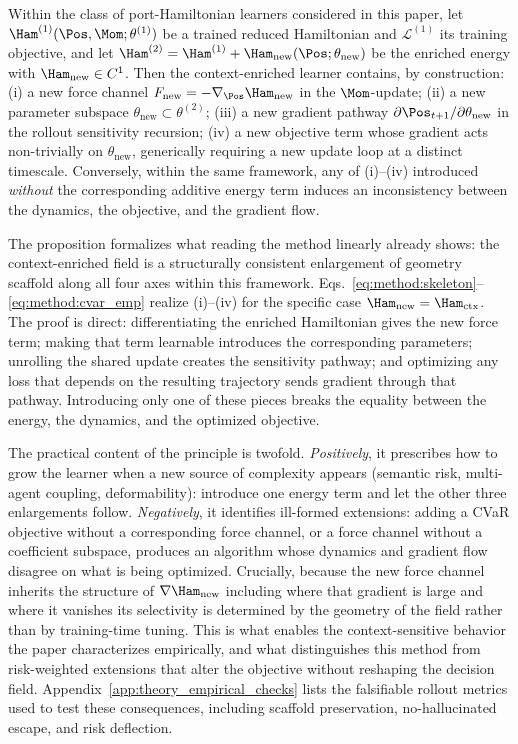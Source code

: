 \begin{proposition}
\label{prop:enrichment}
Within the class of port-Hamiltonian learners considered in this paper,
let $\Ham^{(1)}(\Pos, \Mom; \theta^{(1)})$ be a trained reduced
Hamiltonian and $\mathcal{L}^{(1)}$ its training objective, and let
$\Ham^{(2)} = \Ham^{(1)} + \Ham_{\mathrm{new}}(\Pos; \theta_{\mathrm{new}})$
be the enriched energy with $\Ham_{\mathrm{new}} \in C^1$. Then the
context-enriched learner contains, by construction:
{\rm (i)} a new force channel $F_{\mathrm{new}} = -\nabla_\Pos
\Ham_{\mathrm{new}}$ in the $\Mom$-update;
{\rm (ii)} a new parameter subspace $\theta_{\mathrm{new}} \subset
\theta^{(2)}$;
{\rm (iii)} a new gradient pathway
$\partial \Pos_{t+1}/\partial \theta_{\mathrm{new}}$ in the rollout
sensitivity recursion;
{\rm (iv)} a new objective term whose gradient acts non-trivially on
$\theta_{\mathrm{new}}$, generically requiring a new update loop at a
distinct timescale.
Conversely, within the same framework, any of {\rm (i)–(iv)} introduced
\emph{without} the corresponding additive energy term induces an
inconsistency between the dynamics, the objective, and the gradient
flow.
\end{proposition}

The proposition formalizes what reading the method linearly already
shows: the context-enriched field is a structurally consistent enlargement of geometry scaffold
along all four axes within this framework.
Eqs.~\eqref{eq:method:skeleton}–\eqref{eq:method:cvar_emp} realize
(i)–(iv) for the specific case $\Ham_{\mathrm{new}} =
\Ham_{\mathrm{ctx}}$. The proof is direct: differentiating the enriched
Hamiltonian gives the new force term; making that term learnable
introduces the corresponding parameters; unrolling the shared update
creates the sensitivity pathway; and optimizing any loss that depends on
the resulting trajectory sends gradient through that pathway. Introducing
only one of these pieces breaks the equality between the energy, the
dynamics, and the optimized objective.

The practical content of the principle is twofold.
\emph{Positively}, it prescribes how to grow the learner when a new
source of complexity appears (semantic risk, multi-agent coupling,
deformability): introduce one energy term and let the other three
enlargements follow. \emph{Negatively}, it identifies ill-formed
extensions: adding a CVaR objective without a corresponding force
channel, or a force channel without a coefficient subspace, produces an
algorithm whose dynamics and gradient flow disagree on what is being
optimized. Crucially, because the new force channel inherits the
structure of $\nabla \Ham_{\mathrm{new}}$ including where that
gradient is large and where it vanishes its selectivity is
determined by the geometry of the field rather than by training-time
tuning. This is what enables the context-sensitive behavior the paper
characterizes empirically, and what distinguishes this method from
risk-weighted extensions that alter the objective without reshaping
the decision field. Appendix~\ref{app:theory_empirical_checks} lists the
falsifiable rollout metrics used to test these consequences, including
scaffold preservation, no-hallucinated escape, and risk deflection.
